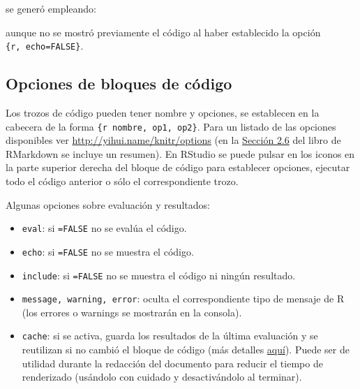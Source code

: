 \documentclass[
]{book}
\newenvironment{Shaded}{\begin{snugshade}}{\end{snugshade}}
\newcommand{\InformationTok}[1]{\textcolor[rgb]{0.56,0.35,0.01}{\textbf{\textit{#1}}}}
\providecommand{\tightlist}{%
  \setlength{\itemsep}{0pt}\setlength{\parskip}{0pt}}
\theoremstyle{break}
\theoremstyle{nonumberplain}
\begin{document}
se generó empleando:

\begin{Shaded}
\end{Shaded}

aunque no se mostró previamente el código al haber establecido la opción \texttt{\textasciigrave{}\textasciigrave{}\textasciigrave{}\{r,\ echo=FALSE\}}.

\hypertarget{opcodigo}{%
\subsection{Opciones de bloques de código}\label{opcodigo}}

Los trozos de código pueden tener nombre y opciones, se establecen en la cabecera de la forma
\texttt{\textasciigrave{}\textasciigrave{}\textasciigrave{}\{r\ nombre,\ op1,\ op2\}}.
Para un listado de las opciones disponibles ver \url{http://yihui.name/knitr/options}
(en la \href{https://bookdown.org/yihui/rmarkdown/r-code.html}{Sección 2.6} del libro de RMarkdown se incluye un resumen).
En RStudio se puede pulsar en los iconos en la parte superior derecha del bloque de código para establecer opciones, ejecutar todo el código anterior o sólo el correspondiente trozo.

Algunas opciones sobre evaluación y resultados:

\begin{itemize}
\tightlist
\item
  \texttt{eval}: si \texttt{=FALSE} no se evalúa el código.
\item
  \texttt{echo}: si \texttt{=FALSE} no se muestra el código.
\item
  \texttt{include}: si \texttt{=FALSE} no se muestra el código ni ningún resultado.
\item
  \texttt{message,\ warning,\ error}: oculta el correspondiente tipo de mensaje de R
  (los errores o warnings se mostrarán en la consola).
\item
  \texttt{cache}: si se activa, guarda los resultados de la última evaluación
  y se reutilizan si no cambió el bloque de código
  (más detalles \href{https://yihui.name/knitr/options/\#cache}{aquí}).
  Puede ser de utilidad durante la redacción del documento para reducir el tiempo de renderizado
  (usándolo con cuidado y desactivándolo al terminar).
\end{itemize}
\end{document}
